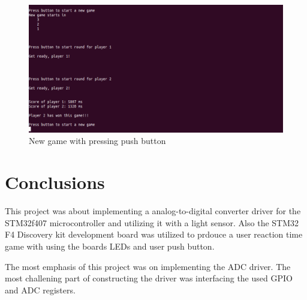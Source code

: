 \begin{figure}[htbp]
  \centering
     \includegraphics[width=1\textwidth]{./figures/Game_demo3.png}
  \caption{New game with pressing push button}
  \label{fig:second_game_run}
\end{figure}

\pagebreak


\section{Conclusions}
This project was about implementing a analog-to-digital converter driver for the STM32f407 microcontroller and utilizing it with a light sensor. Also the STM32 F4 Discovery kit development board was utilized to prdouce a user reaction time game with using the boards LEDs and user push button.\\
\par
The most emphasis of this project was on implementing the ADC driver. The most challening part of constructing the driver was interfacing the used GPIO and ADC registers.
